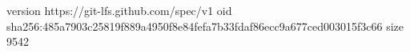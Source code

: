 version https://git-lfs.github.com/spec/v1
oid sha256:485a7903c25819f889a4950f8e84fefa7b33fdaf86ecc9a677ced003015f3c66
size 9542
